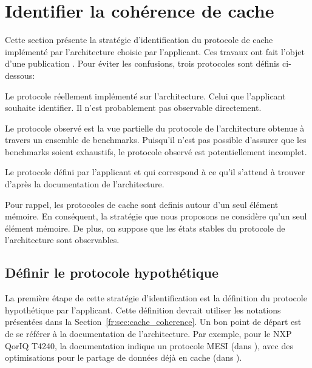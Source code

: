 \section{Identifier la coh\'erence de cache}
\label{fr:sec:identify}
Cette section présente la stratégie d'identification du protocole de cache
implémenté par l'architecture choisie par l'applicant. Ces travaux ont fait
l'objet d'une publication \cite{ecrts20}. Pour éviter les confusions, trois
protocoles sont définis ci-dessous:

\begin{definition}
Le protocole réellement implémenté sur l'architecture. Celui que l'applicant
souhaite identifier. Il n'est probablement pas observable directement.
\end{definition}

\begin{definition}
Le protocole observé est la vue partielle du protocole de l'architecture
obtenue à travers un ensemble de benchmarks. Puisqu'il n'est pas possible
d'assurer que les benchmarks soient exhaustifs, le protocole
observé est potentiellement incomplet.
\end{definition}

\begin{definition}
  Le protocole défini par l'applicant et qui correspond à ce qu'il
  s'attend à trouver d'après la documentation de l'architecture.
\end{definition}

Pour rappel, les protocoles de cache sont definis autour d'un seul
élément mémoire. En conséquent, la stratégie que nous proposons ne
considère qu'un seul élément mémoire. De plus, on suppose que
les états stables du protocole de l'architecture sont observables.

\subsection{Définir le protocole hypothétique}
La première étape de cette stratégie d'identification est la définition du
protocole hypothétique par l'applicant. Cette définition devrait utiliser
les notations présentées dans la Section~\ref{fr:sec:cache_coherence}. Un bon
point de départ est de se référer à la documentation de l'architecture.
Par exemple, pour le NXP QorIQ T4240, la documentation indique un protocole
MESI (dans \cite{e6500}), avec des optimisations pour le partage de données déjà
en cache (dans \cite{T4240}).

